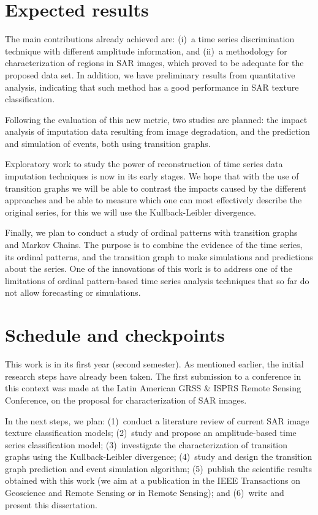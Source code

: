 \documentclass[paper=letter, fontsize=12pt]{article}
\begin{document}
	\section{Expected results}\label{sec:results}
	
	The main contributions already achieved are:
	(i)~a time series discrimination technique with different amplitude information, and
	(ii)~a methodology for characterization of regions in SAR images, which proved to be adequate for the proposed data set.
	In addition, we have preliminary results from quantitative analysis, indicating that such method has a good performance in SAR texture classification.
	
	Following the evaluation of this new metric, two studies are planned: 
	the impact analysis of imputation data resulting from image degradation, and 
	the prediction and simulation of events, both using transition graphs.
	
	Exploratory work to study the power of reconstruction of time series data imputation techniques is now in its early stages.
	We hope that with the use of transition graphs we will be able to contrast the impacts caused by the different approaches and be able to measure which one can most effectively describe the original series, for this we will use the Kullback-Leibler divergence.
	
	Finally, we plan to conduct a study of ordinal patterns with transition graphs and Markov Chains.
	The purpose is to combine the evidence of the time series, its ordinal patterns, and the transition graph to make simulations and predictions about the series.
	One of the innovations of this work is to address one of the limitations of ordinal pattern-based time series analysis techniques that so far do not allow forecasting or simulations.
	
	
	\section{Schedule and checkpoints}\label{sec:checkpoint}
	
	This work is in its first year (second semester). 
	As mentioned earlier, the initial research steps have already been taken.
	The first submission to a conference in this context was made at the Latin American GRSS \& ISPRS Remote Sensing Conference, on the proposal for characterization of SAR images.
	
	In the next steps, we plan:
	(1)~conduct a literature review of current SAR image texture classification models;
	(2)~study and propose an amplitude-based time series classification model;
	(3)~investigate the characterization of transition graphs using the Kullback-Leibler divergence; 
	(4)~study and design the transition graph prediction and event simulation algorithm; 
	(5)~publish the scientific results obtained with this work (we aim at a publication in the IEEE Transactions on Geoscience and Remote Sensing or in Remote Sensing); and
	(6)~write and present this dissertation.
	
\end{document}
